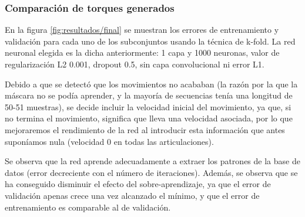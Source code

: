 \subsubsection{Comparación de torques generados}
En la figura \ref{fig:resultados/final} se muestran los errores de entrenamiento y validación para cada uno de los subconjuntos usando la técnica de k-fold. La red neuronal elegida es la dicha anteriormente: 1 capa y 1000 neuronas, valor de regularización L2 0.001, dropout 0.5, sin capa convolucional ni error L1.

Debido a que se detectó que los movimientos no acababan (la razón por la que la máscara no se podía aprender, y la mayoría de secuencias tenía una longitud de 50-51 muestras), se decide incluir la velocidad inicial del movimiento, ya que, si no termina el movimiento, significa que lleva una velocidad asociada, por lo que mejoraremos el rendimiento de la red al introducir esta información que antes suponíamos nula (velocidad 0 en todas las articulaciones).

Se observa que la red aprende adecuadamente a extraer los patrones de la base de datos (error decreciente con el número de iteraciones). Además, se observa que se ha conseguido disminuir el efecto del sobre-aprendizaje, ya que el error de validación apenas crece una vez alcanzado el mínimo, y que el error de entrenamiento es comparable al de validación.

